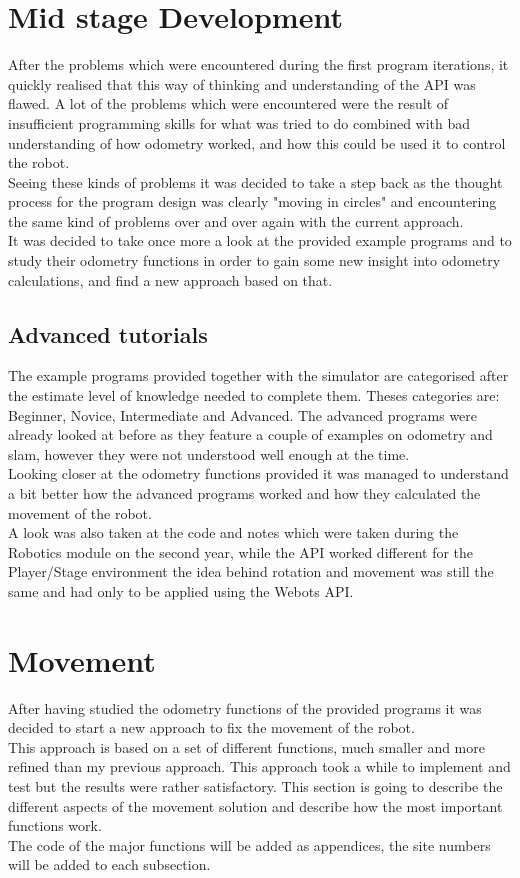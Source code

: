 \section{Mid stage Development}
After the problems which were encountered during the first program iterations, it quickly realised that this way of thinking and understanding of the API was flawed. A lot of the problems which were encountered were the result of insufficient programming skills for what  was tried to do combined with bad understanding of how odometry worked, and how this could be used it to control the robot.\\
Seeing these kinds of problems it was decided to take a step back as the thought process for the program design was clearly "moving in circles" and encountering the same kind of problems over and over again with the current approach. \\
It was decided to take once more a look at the provided example programs and to study their odometry functions in order to gain some new insight into odometry calculations, and find a new approach based on that.

\subsection{Advanced tutorials}
The example programs provided together with the simulator are categorised after the estimate level of knowledge needed to complete them. Theses categories are: Beginner, Novice, Intermediate and Advanced. The advanced programs were already looked at before as they feature a couple of examples on odometry and slam, however they were not understood  well enough at the time.\\ 
Looking closer at the odometry functions provided it was managed to understand a bit better how the advanced programs worked and how they calculated the movement of the robot. \\[3ex]

A look was also taken at the code and notes which were taken during the Robotics module on the second year, while the API worked different for the Player/Stage environment the idea behind rotation and movement was still the same and had only to be applied using the Webots API.

\section{Movement}
After having studied the odometry functions of the provided programs it was decided to start a new approach to fix the movement of the robot.\\
This approach is based on a set of different functions, much smaller and more refined than my previous approach. This approach took a while to implement and test but the results were rather satisfactory. This section is going to describe the different aspects of the movement solution and describe how the most important functions work.\\
The code of the major functions will be added as appendices, the site numbers will be added to each subsection.

